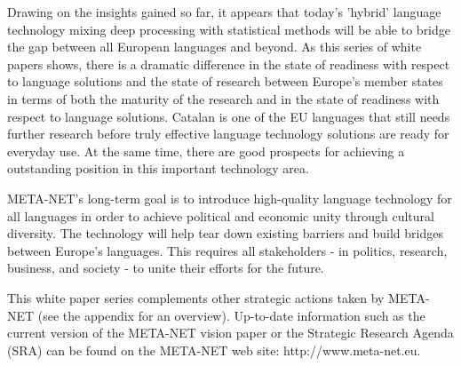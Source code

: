 \begin{multicols}{2}

    Drawing on the insights gained so far, it appears that today’s 'hybrid' language technology mixing deep processing with statistical methods will be able to bridge the gap between all European languages and beyond. As this series of white papers shows, there is a dramatic difference in the state of readiness with respect to language solutions and the state of research between Europe’s member states in terms of both the maturity of the research and in the state of readiness with respect to language solutions. Catalan is one of the EU languages that still needs further research before truly effective language technology solutions are ready for everyday use. At the same time, there are good prospects for achieving a outstanding position in this important technology area. 

    META-NET’s long-term goal is to introduce high-quality language technology for all languages in order to achieve political and economic unity through cultural diversity. The technology will help tear down existing barriers and build bridges between Europe’s languages. This requires all stakeholders - in politics, research, business, and society - to unite their efforts for the future.

    This white paper series complements other strategic actions taken by META-NET (see the appendix for an overview). Up-to-date information such as the current version of the META-NET vision paper \cite{Meta1} or the Strategic Research Agenda (SRA) can be found on the META-NET web site: http://www.meta-net.eu.
\end{multicols}

\clearpage



